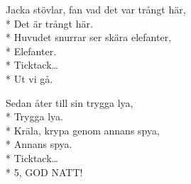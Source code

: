\begin{SongText}
\begin{SongVerse}
        Jacka stövlar, fan vad det var trångt här,\\*%
        Det är trångt här.\\*%
        Huvudet snurrar ser skära elefanter,\\*%
        Elefanter.\\*%
        Ticktack…\\*%
        Ut vi gå.
    \end{SongVerse}
    \begin{SongVerse}
        Sedan åter till sin trygga lya,\\*%
        Trygga lya.\\*%
        Kräla, krypa genom annans spya,\\*%
        Annans spya.\\*%
        Ticktack…\\*%
        5, GOD NATT!
    \end{SongVerse}
\end{SongText}
